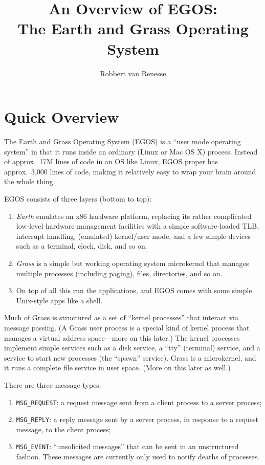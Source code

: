 \documentclass{article}
\title{An Overview of EGOS: \\ The Earth and Grass Operating System}
\author{Robbert van Renesse}
\date{}
\begin{document}
\maketitle

\section{Quick Overview}

The Earth and Grass Operating System (EGOS) is a ``user mode operating system''
in that it runs inside an ordinary (Linux or Mac OS X) process.
Instead of approx.~17M lines of code in an OS like Linux, EGOS proper has
approx.~3,000 lines of code, making it relatively easy to wrap your brain around the
whole thing.

EGOS consists of three layers (bottom to top):
\begin{enumerate}
\item \emph{Earth} emulates an x86 hardware platform, replacing its rather
complicated low-level hardware management facilities with a simple
software-loaded TLB, interrupt handling,
(emulated) kernel/user mode, and a few simple devices such as a terminal,
clock, disk, and so on.
\item \emph{Grass} is a simple but working operating system microkernel that manages
multiple processes (including paging), files, directories, and so on.
\item On top of all this run the applications, and EGOS comes with some
simple Unix-style apps like a shell.
\end{enumerate}

Much of Grass is structured as a set of ``kernel processes'' that
interact via message passing.  (A Grass user process is a special
kind of kernel process that manages a virtual address space---more on
this later.)
The kernel processes implement simple services such as a disk service,
a ``tty'' (terminal) service,
and a service to start new processes (the ``spawn'' service).
Grass is a microkernel, and it runs a complete file service in user space.
(More on this later as well.)

There are three message types:
\begin{enumerate}
\item \texttt{MSG\_REQUEST}: a request message sent from a client process
to a server process;
\item \texttt{MSG\_REPLY}: a reply message sent by a server process,
in response to a request message, to the client process;
\item \texttt{MSG\_EVENT}: ``unsolicited messages'' that can be sent
in an unstructured fashion.  These messages are currently only used to
notify deaths of processes.
\end{enumerate}
\end{document}
